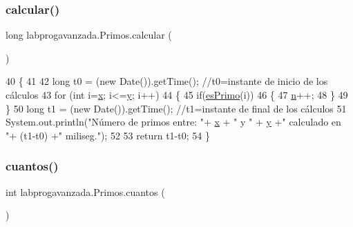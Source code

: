 \subsubsection{\texorpdfstring{calcular()}{calcular()}}
{\footnotesize\ttfamily long labprogavanzada.\+Primos.\+calcular (\begin{DoxyParamCaption}{ }\end{DoxyParamCaption})\hspace{0.3cm}{\ttfamily [inline]}}


\begin{DoxyCode}
40                           \{
41         
42         \textcolor{keywordtype}{long} t0 = (\textcolor{keyword}{new} Date()).getTime(); \textcolor{comment}{//t0=instante de inicio de los cálculos}
43         \textcolor{keywordflow}{for} (\textcolor{keywordtype}{int} i=\mbox{\hyperlink{classlabprogavanzada_1_1_primos_a0755e3305c771aa34e184c9719b0e2ff}{x}}; i<=\mbox{\hyperlink{classlabprogavanzada_1_1_primos_a5a48c8b02403aee0c1741dd3abf91f47}{y}}; i++)
44         \{
45             \textcolor{keywordflow}{if}(\mbox{\hyperlink{classlabprogavanzada_1_1_primos_a7eeebcb76da9a4ad43a1889bdee5bb07}{esPrimo}}(i))
46             \{
47                 \mbox{\hyperlink{classlabprogavanzada_1_1_primos_a07e981f7bb9b39f7ead20be760e628fb}{n}}++;
48             \}
49         \}
50         \textcolor{keywordtype}{long} t1 = (\textcolor{keyword}{new} Date()).getTime(); \textcolor{comment}{//t1=instante de final de los cálculos}
51            System.out.println(\textcolor{stringliteral}{"Número de primos entre: "}+ \mbox{\hyperlink{classlabprogavanzada_1_1_primos_a0755e3305c771aa34e184c9719b0e2ff}{x}} + \textcolor{stringliteral}{" y "} + \mbox{\hyperlink{classlabprogavanzada_1_1_primos_a5a48c8b02403aee0c1741dd3abf91f47}{y}} +\textcolor{stringliteral}{" calculado en "}+ (t1-t0) +\textcolor{stringliteral}{"
       miliseg."});
52            
53         \textcolor{keywordflow}{return} t1-t0;
54     \}
\end{DoxyCode}
\mbox{\label{classlabprogavanzada_1_1_primos_a4c867a357848bb685f59120ae62844f0}} 
\subsubsection{\texorpdfstring{cuantos()}{cuantos()}}
{\footnotesize\ttfamily int labprogavanzada.\+Primos.\+cuantos (\begin{DoxyParamCaption}{ }\end{DoxyParamCaption})\hspace{0.3cm}{\ttfamily [inline]}}



